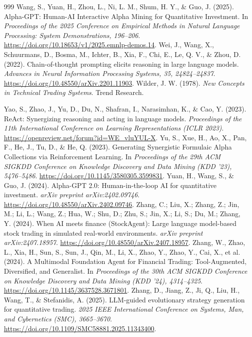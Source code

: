 \documentclass[11pt,a4paper]{article}
\begin{document}
\begin{thebibliography}{999}
 Wang, S., Yuan, H., Zhou, L., Ni, L. M., Shum, H. Y., \& Guo, J. (2025). Alpha-GPT: Human-AI Interactive Alpha Mining for Quantitative Investment. In \emph{Proceedings of the 2025 Conference on Empirical Methods in Natural Language Processing: System Demonstrations, 196--206}. \url{https://doi.org/10.18653/v1/2025.emnlp-demos.14}.
 Wei, J., Wang, X., Schuurmans, D., Bosma, M., Ichter, B., Xia, F., Chi, E., Le, Q. V., \& Zhou, D. (2022). Chain-of-thought prompting elicits reasoning in large language models. \emph{Advances in Neural Information Processing Systems, 35, 24824--24837}. \url{https://doi.org/10.48550/arXiv.2201.11903}.
 Wilder, J. W. (1978). \emph{New Concepts in Technical Trading Systems}. Trend Research.

 Yao, S., Zhao, J., Yu, D., Du, N., Shafran, I., Narasimhan, K., \& Cao, Y. (2023). ReAct: Synergizing reasoning and acting in language models. \emph{Proceedings of the 11th International Conference on Learning Representations (ICLR 2023)}. \url{https://openreview.net/forum?id=WE_vluYUL-X}.
 Yu, S., Xue, H., Ao, X., Pan, F., He, J., Tu, D., \& He, Q. (2023). Generating Synergistic Formulaic Alpha Collections via Reinforcement Learning. In \emph{Proceedings of the 29th ACM SIGKDD Conference on Knowledge Discovery and Data Mining (KDD '23), 5476--5486}. \url{https://doi.org/10.1145/3580305.3599831}.
 Yuan, H., Wang, S., \& Guo, J. (2024). Alpha-GPT 2.0: Human-in-the-loop AI for quantitative investment. \emph{arXiv preprint arXiv:2402.09746}. \url{https://doi.org/10.48550/arXiv.2402.09746}.
 Zhang, C.; Liu, X.; Zhang, Z.; Jin, M.; Li, L.; Wang, Z.; Hua, W.; Shu, D.; Zhu, S.; Jin, X.; Li, S.; Du, M.; Zhang, Y. (2024). When AI meets finance (StockAgent): Large language model-based stock trading in simulated real-world environments. \emph{arXiv preprint arXiv:2407.18957}. \url{https://doi.org/10.48550/arXiv.2407.18957}.
 Zhang, W., Zhao, L., Xia, H., Sun, S., Sun, J., Qin, M., Li, X., Zhao, Y., Zhao, Y., Cai, X., et al. (2024). A Multimodal Foundation Agent for Financial Trading: Tool-Augmented, Diversified, and Generalist. In \emph{Proceedings of the 30th ACM SIGKDD Conference on Knowledge Discovery and Data Mining (KDD '24), 4314--4325}. \url{https://doi.org/10.1145/3637528.3671801}.
 Zhang, D., Jiang, Z., Ji, Q., Liu, H., Wang, T., \& Stefanidis, A. (2025). LLM-guided evolutionary strategy generation for quantitative trading. \emph{2025 IEEE International Conference on Systems, Man, and Cybernetics (SMC), 3665--3670}. \url{https://doi.org/10.1109/SMC58881.2025.11343400}.

\end{thebibliography}
\end{document}

